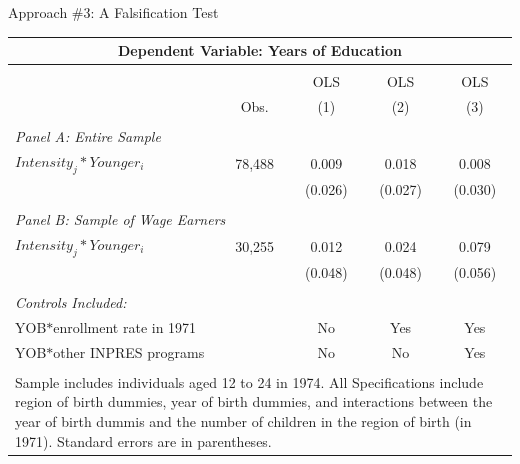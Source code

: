 \documentclass[10pt,xcolor=table,ignorenonframetext,handout,aspectratio=169]{beamer}
\begin{document}
\newpage
\begin{frame}{Approach \#3:  A Falsification Test}

\medskip
\medskip
\begin{center}
\begin{footnotesize}
\begin{tabular}{lcccc}
\multicolumn{5}{c}{\textbf{Dependent Variable:  Years of Education}} \\ [0.6ex]
\hline \hline
& & & & \\ [-2.2ex]
&         & OLS   & OLS & OLS \\ [0.6ex]
& Obs.     & (1)   & (2) & (3) \\ [0.6ex]
\hline
& & & & \\ [-2.2ex]
\multicolumn{5}{l}{\textit{Panel A:  Entire Sample}} \\ [0.6ex]
$Intensity_j * Younger_i$ & 78,488    &  0.009    & 0.018 & 0.008 \\ [0.6ex]
&           & (0.026)   & (0.027)   & (0.030) \\ [0.6ex]
\hline
& & & & \\ [-2.2ex]
\multicolumn{5}{l}{\textit{Panel B:  Sample of Wage Earners}} \\ [0.6ex]
$Intensity_j * Younger_i$ & 30,255    &  0.012    & 0.024 & 0.079 \\ [0.6ex]
&           & (0.048)   & (0.048)   & (0.056) \\ [0.6ex]
\hline
& & & & \\ [-2.2ex]
\multicolumn{5}{l}{\textit{Controls Included:}} \\ [0.6ex]
YOB$*$enrollment rate in 1971   &  & No & Yes & Yes \\ [0.6ex]
YOB$*$other INPRES programs   &  & No & No & Yes \\ [0.6ex]
\hline
& & & & \\ [-2.2ex]
\multicolumn{5}{p{9.5cm}}{\scriptsize{Sample includes individuals aged 12 to 24 in 1974.  All Specifications include region of birth dummies, year of birth dummies, and interactions between the year of birth dummis and the number of children in the region of birth (in 1971).  Standard errors are in parentheses.}}
\end{tabular}
\end{footnotesize}
\end{center}

\end{frame}
\end{document}
